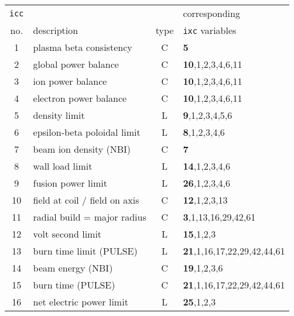 
\begin{table}[tbph]
\footnotesize
\begin{center}

\begin{tabular}{||c|l|c|l||} \hline
{\tt icc} &                                               &      & corresponding \\
no. & description                                         & type & {\tt ixc} variables \\ \hline
1   & plasma beta consistency                             & C    & {\bf 5} \\
2   & global power balance                                & C    & {\bf 10},1,2,3,4,6,11 \\
3   & ion power balance                                   & C    & {\bf 10},1,2,3,4,6,11 \\
4   & electron power balance                              & C    & {\bf 10},1,2,3,4,6,11 \\
5   & density limit                                       & L    & {\bf 9},1,2,3,4,5,6 \\
6   & epsilon-beta poloidal limit                         & L    & {\bf 8},1,2,3,4,6 \\
7   & beam ion density (NBI)                              & C    & {\bf 7} \\
8   & wall load limit                                     & L    & {\bf 14},1,2,3,4,6 \\
9   & fusion power limit                                  & L    & {\bf 26},1,2,3,4,6 \\
10  & field at coil / field on axis                       & C    & {\bf 12},1,2,3,13 \\
11  & radial build = major radius                         & C    & {\bf 3},1,13,16,29,42,61 \\
12  & volt second limit                                   & L    & {\bf 15},1,2,3 \\
13  & burn time limit (PULSE)                             & L    & {\bf 21},1,16,17,22,29,42,44,61 \\
14  & beam energy (NBI)                                   & C    & {\bf 19},1,2,3,6 \\
15  & burn time (PULSE) 			          & C    & {\bf 21},1,16,17,22,29,42,44,61 \\
16  & net electric power limit                            & L    & {\bf 25},1,2,3 \\

\end{tabular}
\end{center}
\end{table}
